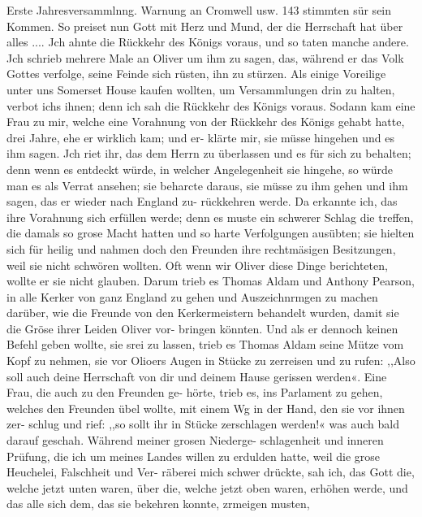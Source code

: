 Erste Jahresversammlnng. Warnung an Cromwell usw. 143
stimmten sür sein Kommen. So preiset nun Gott mit Herz und
Mund, der die Herrschaft hat über alles .... Jch ahnte die
Rückkehr des Königs voraus, und so taten manche andere. Jch
schrieb mehrere Male an Oliver um ihm zu sagen, das, während
er das Volk Gottes verfolge, seine Feinde sich rüsten, ihn zu
stürzen. Als einige Voreilige unter uns Somerset House kaufen
wollten, um Versammlungen drin zu halten, verbot ichs ihnen;
denn ich sah die Rückkehr des Königs voraus. Sodann kam eine
Frau zu mir, welche eine Vorahnung von der Rückkehr des
Königs gehabt hatte, drei Jahre, ehe er wirklich kam; und er-
klärte mir, sie müsse hingehen und es ihm sagen. Jch riet ihr,
das dem Herrn zu überlassen und es für sich zu behalten; denn
wenn es entdeckt würde, in welcher Angelegenheit sie hingehe, so
würde man es als Verrat ansehen; sie beharcte daraus, sie müsse
zu ihm gehen und ihm sagen, das er wieder nach England zu-
rückkehren werde. Da erkannte ich, das ihre Vorahnung sich
erfüllen werde; denn es muste ein schwerer Schlag die treffen,
die damals so grose Macht hatten und so harte Verfolgungen
ausübten; sie hielten sich für heilig und nahmen doch den Freunden
ihre rechtmäsigen Besitzungen, weil sie nicht schwören wollten.
Oft wenn wir Oliver diese Dinge berichteten, wollte er sie nicht
glauben. Darum trieb es Thomas Aldam und Anthony Pearson,
in alle Kerker von ganz England zu gehen und Auszeichnrmgen
zu machen darüber, wie die Freunde von den Kerkermeistern
behandelt wurden, damit sie die Gröse ihrer Leiden Oliver vor-
bringen könnten. Und als er dennoch keinen Befehl geben wollte,
sie srei zu lassen, trieb es Thomas Aldam seine Mütze vom Kopf
zu nehmen, sie vor Olioers Augen in Stücke zu zerreisen und zu
rufen: ,,Also soll auch deine Herrschaft von dir und deinem Hause
gerissen werden«. Eine Frau, die auch zu den Freunden ge-
hörte, trieb es, ins Parlament zu gehen, welches den Freunden
übel wollte, mit einem Wg in der Hand, den sie vor ihnen zer-
schlug und rief: ,,so sollt ihr in Stücke zerschlagen werden!« was
auch bald darauf geschah. Während meiner grosen Niederge-
schlagenheit und inneren Prüfung, die ich um meines Landes willen
zu erdulden hatte, weil die grose Heuchelei, Falschheit und Ver-
räberei mich schwer drückte, sah ich, das Gott die, welche jetzt
unten waren, über die, welche jetzt oben waren, erhöhen werde,
und das alle sich dem, das sie bekehren konnte, zrmeigen musten,


